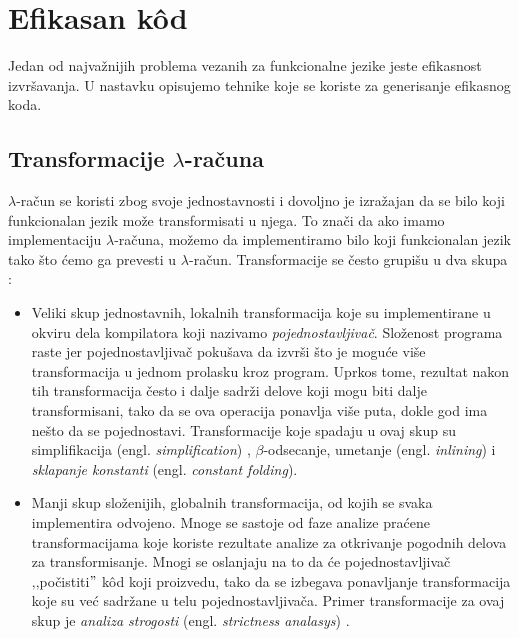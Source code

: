 \section{Efikasan k\^od}
\label{sec:efikasan kod}


Jedan od najvažnijih problema vezanih za funkcionalne jezike jeste efikasnost izvršavanja. 
U nastavku opisujemo tehnike koje se koriste za generisanje efikasnog koda.	


\subsection{Transformacije $\lambda$-računa}

$\lambda$-račun se koristi zbog svoje jednostavnosti i dovoljno je izražajan da se bilo koji funkcionalan jezik može transformisati u njega. To znači da ako imamo implementaciju $\lambda$-računa, možemo da implementiramo  bilo koji funkcionalan jezik tako što ćemo ga prevesti u $\lambda$-račun. Transformacije se često grupišu u dva skupa :


\begin{itemize}
	\item Veliki skup jednostavnih, lokalnih transformacija koje su implementirane u okviru dela kompilatora koji nazivamo \textit{pojednostavljivač}. Složenost programa raste jer pojednostavljivač pokušava da izvrši što je moguće više transformacija u jednom prolasku kroz program. Uprkos tome, rezultat nakon tih transformacija često i dalje sadrži delove koji mogu biti dalje transformisani, tako da se ova operacija ponavlja više puta, dokle god ima nešto da se pojednostavi. Transformacije koje spadaju u ovaj skup su simplifikacija (engl. \textit{simplification}) \cite{compilation-by-program-transformation}, $\beta$-odsecanje, umetanje (engl. \textit{inlining}) i \textit{sklapanje konstanti} (engl. \textit{constant folding}).
	
	\item Manji skup složenijih, globalnih transformacija, od kojih se svaka implementira odvojeno. Mnoge se sastoje od faze analize praćene transformacijama koje koriste rezultate analize za otkrivanje pogodnih delova za transformisanje. Mnogi se oslanjaju na to da će pojednostavljivač ‚‚počistiti$"$ k\^ od koji proizvedu, tako da se izbegava ponavljanje transformacija koje su već sadržane u telu pojednostavljivača. Primer transformacije za ovaj skup je  \textit{analiza strogosti} (engl. \textit{strictness analasys}) \cite{haskell-by-program-transformation}. 
	
\end{itemize}
  

